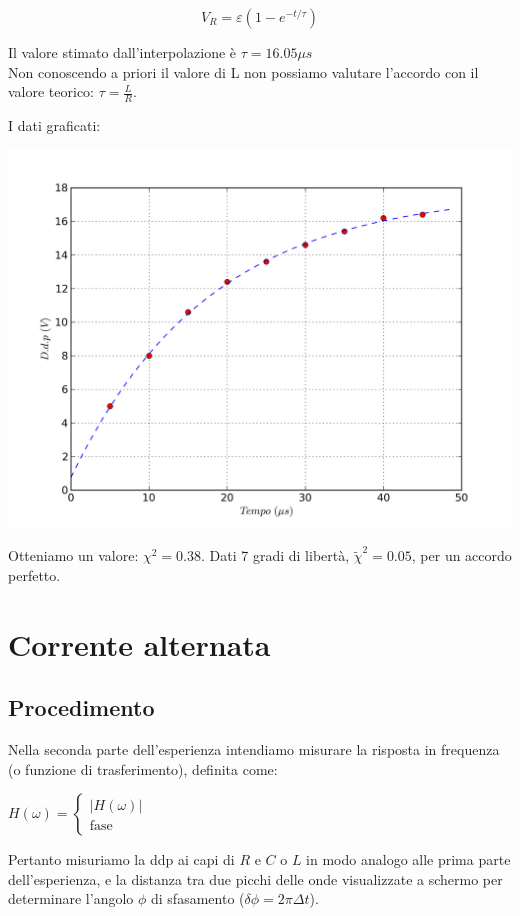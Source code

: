 $$V_R = \varepsilon \left( 1-e^{-t/\tau} \right)$$

Il valore stimato dall'interpolazione è $\tau=16.05 \mu s$ \\
Non conoscendo a priori il valore di L non possiamo valutare l'accordo con il valore teorico: $\tau=\frac{L}{R}$.

I dati graficati:
\begin{center}
 \includegraphics[scale=0.70]{grafici/C3/fitindu.png}
\end{center}

Otteniamo un valore: $\chi^2 = 0.38 $. Dati 7 gradi di libertà, $\tilde{\chi}^2 = 0.05$, per un accordo perfetto.


\section{Corrente alternata}
\subsection{Procedimento}
Nella seconda parte dell'esperienza intendiamo misurare la risposta in frequenza (o funzione di trasferimento), definita come:

$H\left(\omega \right) = \begin{cases}
                          |H\left(\omega \right)| \\
                          \text{fase}
                         \end{cases}
$  

Pertanto misuriamo la ddp ai capi di $R$ e $C$ o $L$ in modo analogo alle prima parte dell'esperienza, e la distanza tra due picchi delle onde visualizzate a schermo per determinare l'angolo $\phi$ di sfasamento ($\delta \phi = 2 \pi \Delta t$).

